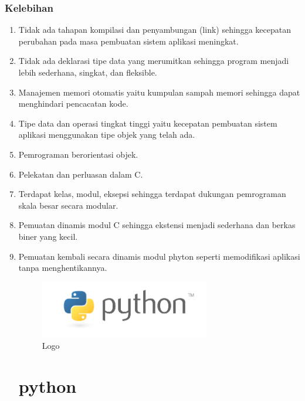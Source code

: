 \subsubsection{Kelebihan}
\begin{enumerate}
\item Tidak ada tahapan kompilasi dan penyambungan (link) sehingga kecepatan perubahan pada masa pembuatan sistem aplikasi meningkat.
\item Tidak ada deklarasi tipe data yang merumitkan sehingga program menjadi lebih sederhana, singkat, dan fleksible.
\item Manajemen memori otomatis yaitu kumpulan sampah memori sehingga dapat menghindari pencacatan kode.
\item Tipe data dan operasi tingkat tinggi yaitu kecepatan pembuatan sistem aplikasi menggunakan tipe objek yang telah ada.
\item Pemrograman berorientasi objek.
\item Pelekatan dan perluasan dalam C.
\item Terdapat kelas, modul, eksepsi sehingga terdapat dukungan pemrograman skala besar secara modular.
\item Pemuatan dinamis modul C sehingga ekstensi menjadi sederhana dan berkas biner yang kecil.
\item Pemuatan kembali secara dinamis modul phyton seperti memodifikasi aplikasi tanpa menghentikannya.



\begin{figure}[ht]
	\centerline{\includegraphics[width=0.70\textwidth]{figures/python}}
	\caption{Logo}
	\label{Logo}
\end{figure}

\section{python}


\end{enumerate}
